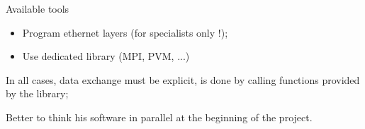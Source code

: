 \documentclass[compress,10pt,aspectratio=169]{beamer}
\begin{document}
    \begin{frame}[fragile]{Available tools}

        \begin{itemize}
            \item Program ethernet layers (for specialists only !);
            \item Use dedicated library (MPI, PVM, ...)
        \end{itemize}

        In all cases, data exchange must be explicit, is done by calling functions provided by the library;

        Better to think his software in parallel at the beginning of the project.
    \end{frame}
\end{document}
